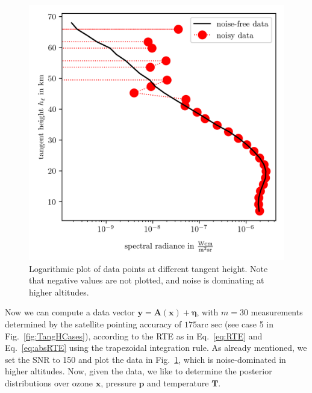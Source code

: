 
\begin{figure}[th!]
	\centering
	\includegraphics{DataPlot.png}
	\caption[Logarithmic plot of data points at different tangent height.]{Logarithmic plot of data points at different tangent height. Note that negative values are not plotted, and noise is dominating at higher altitudes.}
	\label{fig:DataPlot}
\end{figure}

Now we can compute a data vector $\bm{y} = \bm{A}(\bm{x}) + \bm{\eta} $, with $m = 30$ measurements determined by the satellite pointing accuracy of $175\text{arc sec}$ (see case 5 in Fig.~\ref{fig:TangHCases}), according to the RTE as in Eq.~\ref{eq:RTE} and Eq.~\ref{eq:absRTE} using the trapezoidal integration rule.
As already mentioned, we set the SNR to 150 and plot the data in Fig.~\ref{fig:DataPlot}, which is noise-dominated in higher altitudes.
Now, given the data, we like to determine the posterior distributions over ozone $\bm{x}$, pressure $\bm{p}$ and temperature $\bm{T}$.
\clearpage
